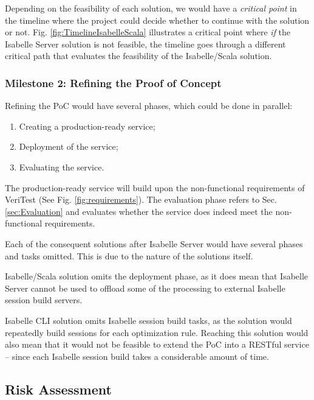 Depending on the feasibility of each solution, we would have a \emph{critical point} in the timeline where the project 
could decide whether to continue with the solution or not. Fig. \ref{fig:TimelineIsabelleScala} illustrates a critical point 
where \emph{if} the Isabelle Server solution is not feasible, the timeline goes through a different critical path that 
evaluates the feasibility of the Isabelle/Scala solution.

\subsubsection{Milestone 2: Refining the Proof of Concept}

Refining the PoC would have several phases, which could be done in parallel:
\begin{enumerate}
    \item Creating a production-ready service;
    \item Deployment of the service;
    \item Evaluating the service.
\end{enumerate}

The production-ready service will build upon the non-functional requirements of VeriTest (See Fig. \ref{fig:requirements}). 
The evaluation phase refers to Sec. \ref{sec:Evaluation} and evaluates whether the service does indeed meet the 
non-functional requirements.

Each of the consequent solutions after Isabelle Server would have several phases and tasks omitted. This is due to the nature 
of the solutions itself. 

Isabelle/Scala solution omits the deployment phase, as it does mean that Isabelle Server cannot be 
used to offload some of the processing to external Isabelle session build servers. 

Isabelle CLI solution omits Isabelle session build tasks, as the solution would repeatedly build sessions for each 
optimization rule. Reaching this solution would also mean that it would not be feasible to extend the PoC into a RESTful 
service -- since each Isabelle session build takes a considerable amount of time.

\subsection{Risk Assessment}

